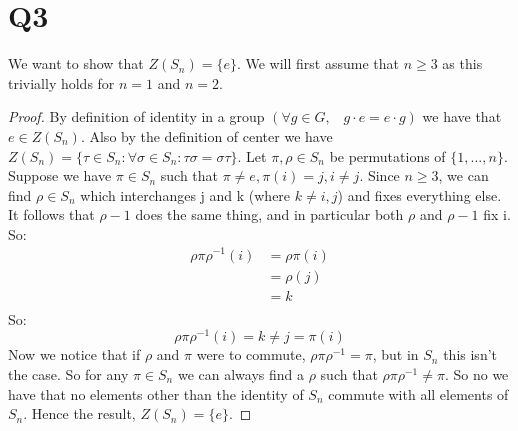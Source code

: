 \documentclass{article}
\begin{document}
\section*{Q3}
We want to show that $Z(S_n)=\{e\}$. We will first assume that $n\geq3$ as this trivially holds for $n=1$ and $n=2$.
\begin{proof}
By definition of identity in a group $(\forall g\in G,\;\;\; g\cdot e=e\cdot g)$ we have that $e\in Z(S_n)$. Also by the definition of center we have $Z(S_n)=\{\tau\in S_n:\forall\sigma\in S_n:\tau\sigma=\sigma\tau\}$. Let $\pi,\rho\in S_n$ be permutations of $\{1,...,n\}$. Suppose we have $\pi\in S_n$ such that $\pi\neq e,\pi(i)=j,i\neq j$. Since $n\geq3$, we can find $\rho\in S_n$ which interchanges j and k (where $k\neq i,j$) and fixes everything else. It follows that $\rho-1$ does the same thing, and in particular both $\rho$ and $\rho-1$ fix i. So: 
\begin{align*}
\rho\pi\rho^{-1}(i)&=\rho\pi(i)\\
&=\rho(j)\\
&=k\\
\end{align*}
So:
$$\rho\pi\rho^{-1}(i)=k\neq j=\pi(i)$$
Now we notice that if $\rho$ and $\pi$ were to commute, $\rho\pi\rho^{-1}=\pi$, but in $S_n$ this isn't the case. So for any $\pi\in S_n$ we can always find a $\rho$ such that $\rho\pi\rho^{-1}\neq\pi$. So no we have that no elements other than the identity of $S_n$ commute with all elements of $S_n$. Hence the result, $Z(S_n)=\{e\}$.
\end{proof}
\end{document}
